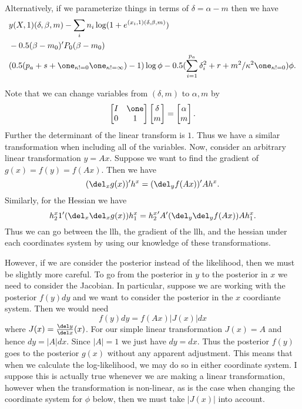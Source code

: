 \documentclass[draft]{article}
\begin{document}
Alternatively, if we parameterize things in terms of $\delta = \alpha - m$ then
we have
\begin{align*}
& y (X,1) (\delta, \beta, m) - \sum_i n_i \log (1 + e^{(x_i,1) (\delta, \beta, m)}) \\
& - 0.5 (\beta - m_0)' P_0 (\beta - m_0) \\
& (0.5 (p_a + s + \one_{\kappa != 0} \one_{\kappa != \infty}) - 1) \log \phi - 0.5 (\sum_{i=1}^{p_a}
\delta_i^2 + r + m^2 / \kappa^2 \one_{\kappa != 0}) \phi.
\end{align*}

Note that we can change variables from $(\delta, m)$ to $\alpha, m$ by
\[
\begin{bmatrix}
I & \one \\
0 & 1
\end{bmatrix}
\begin{bmatrix}
\delta \\ m
\end{bmatrix}
= 
\begin{bmatrix}
\alpha \\ m
\end{bmatrix}.
\]
Further the determinant of the linear transform is $1$.  Thus we have a similar
transformation when including all of the variables.  Now, consider an arbitrary
linear transformation $y = A x$.  Suppose we want to find the gradient of $g(x)
= f(y) = f(A x)$.  Then we have
\[
(\del_x g(x))' h^{x} = (\del_y f(Ax))' A h^{x}.
\]
Similarly, for the Hessian we have
\[
{h^x_2}1' (\del_x \del_x g(x)) h^x_1 = {h^{x}_2}' A' (\del_y \del_y f(Ax)) A h^{x}_1.
\]
Thus we can go between the llh, the gradient of the llh, and the hessian under
each coordinates system by using our knowledge of these transformations.

However, if we are consider the posterior instead of the likelihood, then we
must be slightly more careful.  To go from the posterior in $y$ to the posterior
in $x$ we need to consider the Jacobian.  In particular, suppose we are working
with the posterior $f(y) dy$ and we want to consider the posterior in the $x$
coordiante system.  Then we would need 
\[
f(y) dy = f(Ax) |J(x)| dx
\]
where $J(x) = \frac{\del y}{\del x}(x)$.  For our simple linear transformation
$J(x) = A$ and hence $dy = |A| dx$.  Since $|A|=1$ we just have $dy = dx$.  Thus
the posterior $f(y)$ goes to the posterior $g(x)$ without any apparent
adjustment.  This means that when we calculate the log-likelihood, we may do so
in either coordinate system.  I suppose this is actually true whenever we are
making a linear transformation, however when the transformation is non-linear,
as is the case when changing the coordinate system for $\phi$ below, then we
must take $|J(x)|$ into account.
\end{document}
